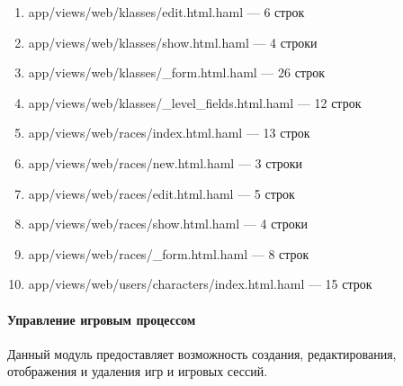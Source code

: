 \begin{enumerate}[label=\arabic*)]
\item app/views/web/klasses/edit.html.haml --- 6 строк
\item app/views/web/klasses/show.html.haml --- 4 строки
\item app/views/web/klasses/\_form.html.haml --- 26 строк
\item app/views/web/klasses/\_level\_fields.html.haml --- 12 строк
\item app/views/web/races/index.html.haml --- 13 строк
\item app/views/web/races/new.html.haml --- 3 строки
\item app/views/web/races/edit.html.haml --- 5 строк
\item app/views/web/races/show.html.haml --- 4 строки
\item app/views/web/races/\_form.html.haml --- 8 строк
\item app/views/web/users/characters/index.html.haml --- 15 строк
\end{enumerate}


\paragraph{Управление игровым процессом}

Данный модуль предоставляет возможность создания, редактирования, отображения и удаления игр и игровых сессий.

